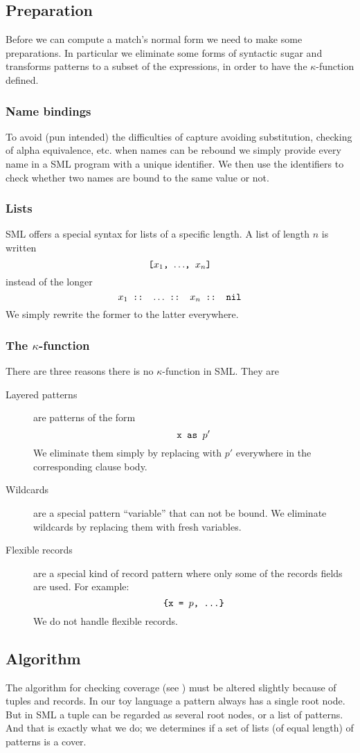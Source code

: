 \subsection{Preparation}\label{sec:preparation}
Before we can compute a match's normal form we need to make some
preparations. In particular we eliminate some forms of syntactic sugar and
transforms patterns to a subset of the expressions, in order to have the
$\kappa$-function defined.

\subsubsection{Name bindings}
To avoid (pun intended) the difficulties of capture avoiding substitution, checking
of alpha equivalence, etc. when names can be rebound we simply provide every
name in a SML program with a unique identifier. We then use the identifiers to
check whether two names are bound to the same value or not.

\subsubsection{Lists}
SML offers a special syntax for lists of a specific length. A list of length $n$
is written
\[
\texttt{[$x_1$, $\ldots$, $x_n$]}
\]
instead of the longer
\[
\texttt{$x_1$ :: $\ldots$ :: $x_n$ :: nil}
\]
We simply rewrite the former to the latter everywhere.

\subsubsection{The $\kappa$-function}
There are three reasons there is no $\kappa$-function in SML. They are
\begin{description}
\item[Layered patterns] are patterns of the form
  \[
  \texttt{x as $p'$}
  \]
  We eliminate them simply by replacing  with $p'$ everywhere in the
  corresponding clause body.
\item[Wildcards] are a special pattern ``variable'' that can not be bound. We
  eliminate wildcards by replacing them with fresh variables.
\item[Flexible records] are a special kind of record pattern where only some of
  the records fields are used. For example:
  \[
  \texttt{\{x = $p$, ...\}}
  \]
  We do not handle flexible records.
\end{description}

\subsection{Algorithm}\label{sec:algorithm}
The algorithm for checking coverage (see ) must be altered
slightly because of tuples and records. In our toy language a pattern always has
a single root node. But in SML a tuple can be regarded as several root nodes, or
a list of patterns. And that is exactly what we do; we determines if a set of
lists (of equal length) of patterns is a cover.

